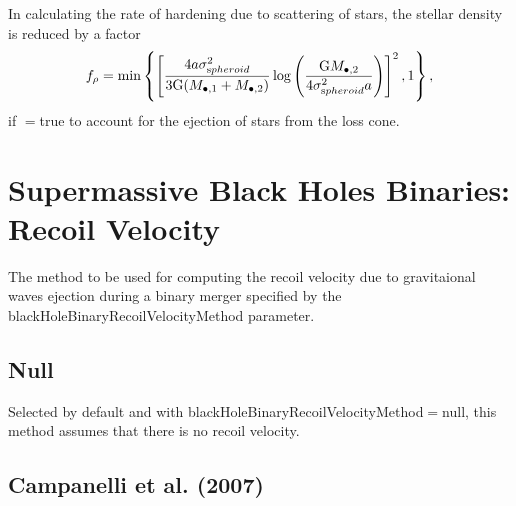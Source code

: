 In calculating the rate of hardening due to scattering of stars, the stellar density is reduced by a factor \citep{volonteri_assembly_2003}
\begin{equation}
f_\rho = \hbox{min}\left\{ \left[ { 4 a \sigma_{\mathrm spheroid}^2 \over 3 {\mathrm G} (M_{\bullet, 1}+M_{\bullet, 2})} \log\left({{\mathrm G} M_{\bullet, 2} \over 4 \sigma_{\mathrm spheroid}^2  a }\right) \right]^2 , 1 \right\},
\end{equation}
if {\normalfont \ttfamily [stellarDensityChangeBinaryMotion]}$=${\normalfont \ttfamily true} to account for the ejection of stars from the loss cone.

\section{Supermassive Black Holes Binaries: Recoil Velocity}\label{sec:binaryBlackHoleRecoil}

The method to be used for computing the recoil velocity due to gravitaional waves ejection during a binary merger specified by the {\normalfont \ttfamily blackHoleBinaryRecoilVelocityMethod} parameter.

\subsection{Null}

Selected by default and with {\normalfont \ttfamily blackHoleBinaryRecoilVelocityMethod}$=${\normalfont \ttfamily null}, this method assumes that there is no recoil velocity.

\subsection{Campanelli et al. (2007)}

